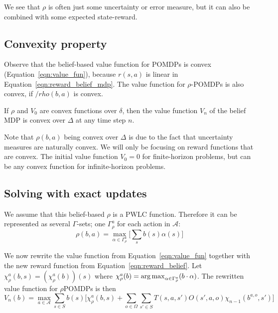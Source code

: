 We see that $\rho$ is often just some uncertainty or error measure, but it can also be combined with some expected state-reward.

\subsection{Convexity property}

Observe that the belief-based value function for POMDPs is convex (Equation~\ref{eqn:value_fun}), because $r(s,a)$ is linear in Equation~\ref{eqn:reward_belief_mdp}. The value function for $\rho$-POMDPs is also convex, if $/rho(b,a)$ is convex.

\begin{theorem}
	If $\rho$ and $V_0$ are convex functions over $\delta$, then the value function $V_n$ of the belief MDP is convex over $\Delta$ at any time step $n$.
\end{theorem}

Note that $\rho(b,a)$ being convex over $\Delta$ is due to the fact that uncertainty measures are naturally convex\cite{p:belief-dependent-rewards}. We will only be focusing on reward functions that are convex. The initial value function $V_0=0$ for finite-horizon problems, but can be any convex function for infinite-horizon problems.

\subsection{Solving with exact updates}
We assume that this belief-based $\rho$ is a PWLC function. Therefore it can be represented as several $\Gamma$-sets; one $\Gamma^a_\rho$ for each action in $\mathcal{A}$:
\begin{equation}
	\label{eqn:reward_belief}
	\rho(b,a)=\max_{\alpha\in\Gamma^a_\rho}\big[\sum_{s}b(s)\alpha(s)\big]
\end{equation}

We now rewrite the value function from Equation~\ref{eqn:value_fun} together with the new reward
function from Equation~\ref{eqn:reward_belief}. Let $\chi_\rho^a(b,s) = (\chi_\rho^a(b))(s)$ where $\chi_\rho^a(b)=\operatorname*{arg\,max}_{\alpha\in\Gamma^a_\rho}(b\cdot\alpha)$. The rewritten value function for $\rho$POMDPs is then
\begin{equation}
	V_n(b)= \max_{a\in \mathcal{A}}\sum_{s\in S}b(s) \big[\chi_\rho^a(b,s) + \sum_{o\in \Omega}\sum_{s'\in S}T(s,a,s')O(s',a,o)\chi_{n-1}(b^{a,o},s') \big]
\end{equation}

